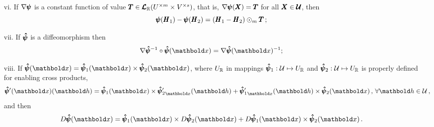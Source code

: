 \begin{itemize}
\begin{equation}
	\end{equation}
	\item[vi.] If $\nabla\pmb{\psi}$ is a constant function of value $\pmb{T}\in\pmb{\mathcal{L}}_{\mathbb{R}}(U^{\times m}\times V^{\times s})$, that is, $\nabla\pmb{\psi}(\pmb{X})=\pmb{T}$ for all $\pmb{X}\in\pmb{\mathcal{U}}$, then 
	\begin{equation}\label{eq:gradConst}
	\pmb{\psi}(\pmb{H}_1)-\pmb{\psi}(\pmb{H}_2)=(\pmb{H}_1-\pmb{H}_2)\odot_m\pmb{T}\,;
	\end{equation}
	\item[vii.] If $\pmb{\hat\psi}$ is a diffeomorphism then 
	\begin{equation}\label{eq:gradDiffeo2}
	\fua{\nabla\tnr{\hat\psi}^{-1}\circ\tnr{\hat\psi}}{\vto{x}}=\fua{\nabla\tnr{\hat\psi}}{\vto{x}}^{-1};
	\end{equation}
	\item[viii.] If $\fua{\tnr{\hat\psi}}{\vto{x}}=\fua{\tnr{\hat\psi}_1}{\vto{x}}\times\fua{\tnr{\hat\psi}_2}{\vto{x}}$, where $U_{\mathbb{R}}$ in mappings  $\pmb{\hat\psi}_1 : {\mathcal{U}} \mapsto U_{\mathbb{R}}$ and $\pmb{\hat\psi}_2 : {\mathcal{U}} \mapsto U_{\mathbb{R}}$ is properly defined for enabling cross products, 
\begin{equation}\label{eq:crossRule}
\fua{\tnr{\hat\psi}'(\vto{x})}{\vto{h}} = \fua{\tnr{\hat\psi}_1}{\vto{x}}\times\fua{{\tnr{\hat\psi}_2'}_{\vto{x}}}{\vto{h}} + \fua{{\tnr{\hat\psi}_1'}_{\vto{x}}}{\vto{h}} \times \fua{\tnr{\hat\psi}_2}{\vto{x}}\,,\,\forall \vto{h}\in\mathcal{U}\,,
\end{equation}
and then 
	\begin{equation}\label{eq:prop3Grad}
	\fua{D\tnr{\hat\psi}}{\vto{x}} = \fua{\tnr{\hat\psi}_1}{\vto{x}}\times\fua{D\tnr{\hat\psi}_2}{\vto{x}}+\fua{D\tnr{\hat\psi}_1}{\vto{x}}\times\fua{\tnr{\hat\psi}_2}{\vto{x}}\,.
	\end{equation}
\end{itemize}

